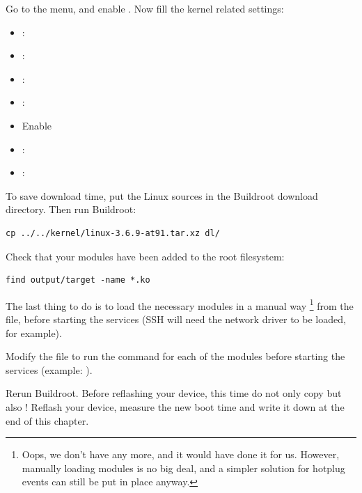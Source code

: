 Go to the  menu, and enable . Now fill
the kernel related settings:

\begin{itemize}
\item {}: 
\item {}:
\item {}: 
\item {}:
\item Enable 
\item {}: 
\item {}: 
\end{itemize}

To save download time, put the Linux sources in the Buildroot download
directory. Then run Buildroot:

\begin{verbatim}
cp ../../kernel/linux-3.6.9-at91.tar.xz dl/
\end{verbatim}

Check that your modules have been added to the root filesystem:

\begin{verbatim}
find output/target -name *.ko
\end{verbatim}

The last thing to do is to load the necessary modules in a manual way
\footnote{Oops, we don't have  any more, and it would have
done it for us. However, manually loading modules is no big deal, and a
simpler solution for hotplug events can still be put in place anyway.}
from the  file, before starting the services (SSH
will need the network driver to be loaded, for example).

Modify the  file to run the
 command for each of the modules before starting the
services (example: ).

Rerun Buildroot. Before reflashing your device, this time do not only
copy  but also
! Reflash your device, measure the new boot time
and write it down at the end of this chapter.

